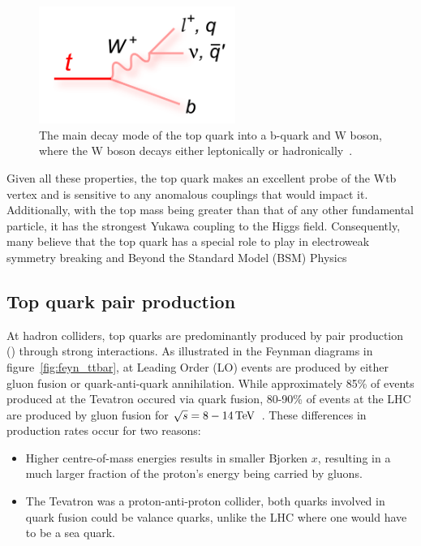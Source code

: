 \begin{figure}[htbp]
\begin{center}
\includegraphics[width=0.57\textwidth]{figs/top-physics/topDecay.png}
\caption{The main decay mode of the top quark into a b-quark and W boson, where the W boson decays either leptonically or hadronically~\cite{topDiagrams}.}
\label{fig:topDecay}
\end{center}
\end{figure}

Given all these properties, the top quark makes an excellent probe of the Wtb vertex and is sensitive to any anomalous couplings that would impact it.
Additionally, with the top mass being greater than that of any other fundamental particle, it has the strongest Yukawa coupling to the Higgs field.
Consequently, many believe that the top quark has a special role to play in electroweak symmetry breaking and Beyond the Standard Model (BSM) Physics~\cite{Giammanco:2017xyn}
 

\subsection{Top quark pair production}\label{subsec:ttbarTheory}
At hadron colliders, top quarks are predominantly produced by pair production (\ttbar) through strong interactions.
As illustrated in the Feynman diagrams in figure~\ref{fig:feyn_ttbar}, at Leading Order (LO) \ttbar events are produced by either gluon fusion or quark-anti-quark annihilation. 
While approximately 85\% of \ttbar events produced at the Tevatron occured via quark fusion, 80-90\% of \ttbar events at the LHC are produced by gluon fusion for $\sqrt{s} = 8-14\,\text{Te\hspace{-.08em}V}$~\cite{Tanabashi:2018oca,Deliot:2011np}.
These differences in production rates occur for two reasons:
\begin{itemize}
\item Higher centre-of-mass energies results in smaller Bjorken $x$, resulting in a much larger fraction of the proton's energy being carried by gluons.
\item The Tevatron was a proton-anti-proton collider, both quarks involved in quark fusion could be valance quarks, unlike the LHC where one would have to be a sea quark. 
\end{itemize} 

